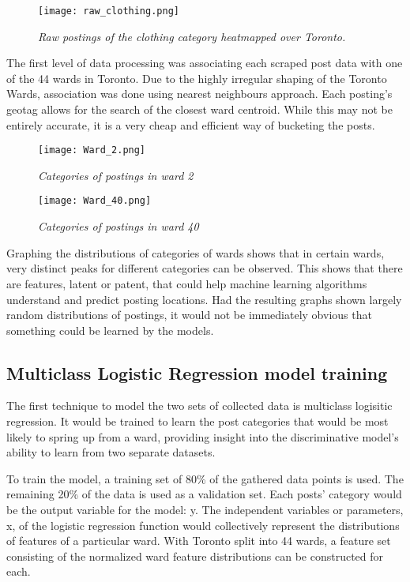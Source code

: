 \documentclass[12pt]{article}
\begin{document}
\begin{figure}[h]
\centering
\texttt{[image: raw\_clothing.png]}
\caption{\textit{Raw postings of the clothing category heatmapped over Toronto.}}
\label{fig:heatmap}
\end{figure}

The first level of data processing was associating each scraped post data with one of the 44 wards in Toronto. Due to the highly irregular shaping of the Toronto Wards, association was done using nearest neighbours approach. Each posting's geotag allows for the search of the closest ward centroid. While this may not be entirely accurate, it is a very cheap and efficient way of bucketing the posts. 

\begin{figure}[h]
\centering
\texttt{[image: Ward\_2.png]}
\caption{\textit{Categories of postings in ward 2}}
\end{figure}

\begin{figure}[h]
\centering
\texttt{[image: Ward\_40.png]}
\caption{\textit{Categories of postings in ward 40}}
\end{figure}

Graphing the distributions of categories of wards shows that in certain wards, very distinct peaks for different categories can be observed. This shows that there are features, latent or patent, that could help machine learning algorithms understand and predict posting locations. Had the resulting graphs shown largely random distributions of postings, it would not be immediately obvious that something could be learned by the models. 

\subsection{Multiclass Logistic Regression model training}
The first technique to model the two sets of collected data is multiclass logisitic regression. It would be trained to learn the post categories that would be most likely to spring up from a ward, providing insight into the discriminative model's ability to learn from two separate datasets.  

To train the model, a training set of 80\% of the gathered data points is used. The remaining 20\% of the data is used as a validation set. Each posts' category would be the output variable for the model: y. The independent variables or parameters, x, of the logistic regression function would collectively represent the distributions of features of a particular ward. With Toronto split into 44 wards, a feature set consisting of the normalized ward feature distributions can be constructed for each.
\end{document}
